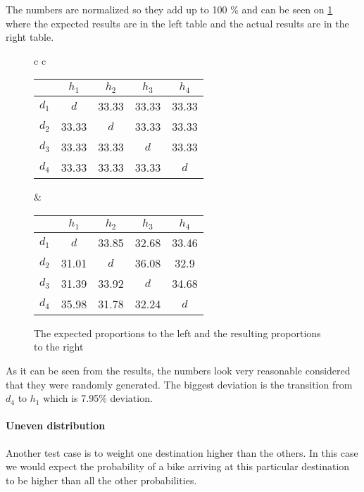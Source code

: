 The numbers are normalized so they add up to 100 \% and can be seen on \cref{even_results} where the expected results are in the left table and the actual results are in the right table.

\begin{figure}
	
	\begin{tabular} {c c }
		
		\begin{tabular}{ | c | c c c c |}
			\hline
			& $ h_1 $ & $ h_2 $ & $ h_3 $ & $ h_4 $\\
			\hline
			$ d_1 $ & $ d $ & 33.33 & 33.33 & 33.33\\
			$ d_2 $ & 33.33 & $ d $ & 33.33 & 33.33\\
			$ d_3 $ & 33.33 & 33.33 & $ d $ & 33.33\\
			$ d_4 $ & 33.33 & 33.33 & 33.33 & $ d $\\
			\hline
		\end{tabular}
		
		&
		
		\begin{tabular}{ | c | c c c c |}
			\hline
			& $ h_1 $ & $ h_2 $ & $ h_3 $ & $ h_4 $\\
			\hline
			$ d_1 $ & $ d $ & 33.85 & 32.68 & 33.46\\
			$ d_2 $ & 31.01 & $ d $ & 36.08 & 32.9\\
			$ d_3 $ & 31.39 & 33.92 & $ d $ & 34.68 \\
			$ d_4 $ & 35.98 & 31.78 & 32.24 & $ d $\\
			\hline
		\end{tabular}
	\end{tabular}
	\caption{The expected proportions to the left and the resulting proportions to the right}\label{even_results}
\end{figure}

As it can be seen from the results, the numbers look very reasonable considered that they were randomly generated. 
The biggest deviation is the transition from $ d_4 $ to $ h_1 $ which is 7.95\% deviation. 

\paragraph{Uneven distribution}
Another test case is to weight one destination higher than the others.
In this case we would expect the probability of a bike arriving at this particular destination to be higher than all the other probabilities.


